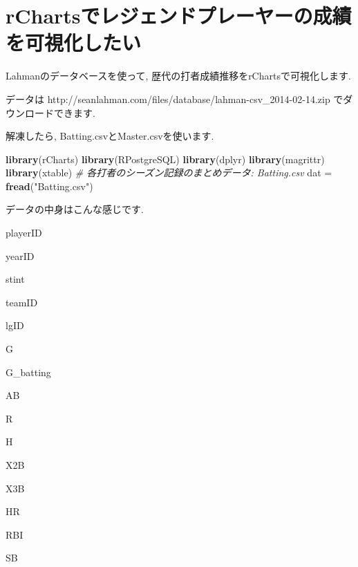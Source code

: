 \documentclass[]{article}
\author{}
\date{}
\newenvironment{Shaded}{}{}
\newcommand{\KeywordTok}[1]{\textcolor[rgb]{0.00,0.44,0.13}{\textbf{{#1}}}}
\newcommand{\DataTypeTok}[1]{\textcolor[rgb]{0.56,0.13,0.00}{{#1}}}
\newcommand{\StringTok}[1]{\textcolor[rgb]{0.25,0.44,0.63}{{#1}}}
\newcommand{\CommentTok}[1]{\textcolor[rgb]{0.38,0.63,0.69}{\textit{{#1}}}}
\newcommand{\NormalTok}[1]{{#1}}
\begin{document}
\section{rChartsでレジェンドプレーヤーの成績を可視化したい}\label{rchartsux3067ux30ecux30b8ux30a7ux30f3ux30c9ux30d7ux30ecux30fcux30e4ux30fcux306eux6210ux7e3eux3092ux53efux8996ux5316ux3057ux305fux3044}

Lahmanのデータベースを使って, 歴代の打者成績推移をrChartsで可視化します.

データは http://seanlahman.com/files/database/lahman-csv\_2014-02-14.zip
でダウンロードできます.

解凍したら, Batting.csvとMaster.csvを使います.

\begin{Shaded}
\begin{Highlighting}[]
\KeywordTok{library}\NormalTok{(rCharts)}
\KeywordTok{library}\NormalTok{(RPostgreSQL)}
\KeywordTok{library}\NormalTok{(dplyr)}
\KeywordTok{library}\NormalTok{(magrittr)}
\KeywordTok{library}\NormalTok{(xtable)}
\CommentTok{# 各打者のシーズン記録のまとめデータ: Batting.csv}
\NormalTok{dat =}\StringTok{ }\KeywordTok{fread}\NormalTok{(}\StringTok{"Batting.csv"}\NormalTok{)}
\end{Highlighting}
\end{Shaded}

データの中身はこんな感じです.

\begin{Shaded}
\end{Shaded}

playerID

yearID

stint

teamID

lgID

G

G\_batting

AB

R

H

X2B

X3B

HR

RBI

SB
\end{document}
